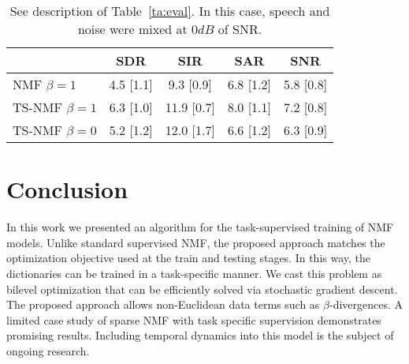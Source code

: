 \begin{table}[tb]
\caption{See description of Table~\ref{ta:eval}. In this case, speech and noise were mixed at $0dB$ of SNR. \label{ta:eval2}}
\vspace{-1.5ex}
\begin{center}
\small{
\begin{tabular}{l|c|c|c|c}
  \hline\hline
& SDR & SIR & SAR & SNR\\
\hline
NMF $\beta=1$   & 4.5 [1.1] &  9.3 [0.9] &   6.8 [1.2]  &  5.8 [0.8]\\
\hline
TS-NMF $\beta=1$ & 6.3 [1.0] &   11.9 [0.7] & 8.0 [1.1] &    7.2 [0.8]\\
TS-NMF $\beta=0$ & 5.2 [1.2] &   12.0 [1.7] & 6.6 [1.2] &    6.3 [0.9]\\
  \hline\hline
\end{tabular}
}
\end{center}
\vspace{-1.5ex}
\end{table}

\section{Conclusion}

In this work we presented an algorithm for the task-supervised training of NMF models. 
Unlike standard supervised NMF, the proposed approach matches the optimization objective used at the train and testing stages. 
In this way, the dictionaries can be trained in a task-specific manner. 
We cast this problem as bilevel optimization that can be efficiently solved via stochastic gradient descent. 
The proposed approach allows non-Euclidean data terms such as $\beta$-divergences. 
A limited case study of sparse NMF with task specific supervision demonstrates promising results. 
Including temporal dynamics into this model is the subject of ongoing research.
